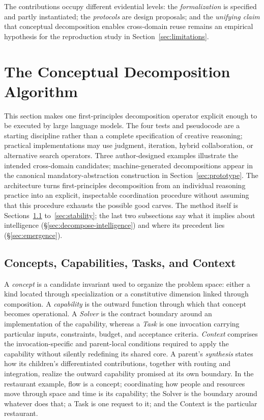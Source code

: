 \documentclass[11pt]{article}
\begin{document}
The contributions occupy different evidential levels: the \emph{formalization} is specified and partly instantiated; the \emph{protocols} are design proposals; and the \emph{unifying claim} that conceptual decomposition enables cross-domain reuse remains an empirical hypothesis for the reproduction study in Section~\ref{sec:limitations}.

\section{The Conceptual Decomposition Algorithm}
\label{sec:algorithm}

This section makes one first-principles decomposition operator explicit enough to be executed by large language models. The four tests and pseudocode are a starting discipline rather than a complete specification of creative reasoning; practical implementations may use judgment, iteration, hybrid collaboration, or alternative search operators. Three author-designed examples illustrate the intended cross-domain candidates; machine-generated decompositions appear in the canonical mandatory-abstraction construction in Section~\ref{sec:prototype}. The architecture turns first-principles decomposition from an individual reasoning practice into an explicit, inspectable coordination procedure without assuming that this procedure exhausts the possible good carves. The method itself is Sections~\ref{sec:concept-task} to~\ref{sec:stability}; the last two subsections say what it implies about intelligence (\S\ref{sec:decompose-intelligence}) and where its precedent lies (\S\ref{sec:emergence}).

\subsection{Concepts, Capabilities, Tasks, and Context}
\label{sec:concept-task}

A \emph{concept} is a candidate invariant used to organize the problem space: either a kind located through specialization or a constitutive dimension linked through composition. A \emph{capability} is the outward function through which that concept becomes operational. A \emph{Solver} is the contract boundary around an implementation of the capability, whereas a \emph{Task} is one invocation carrying particular inputs, constraints, budget, and acceptance criteria. \emph{Context} comprises the invocation-specific and parent-local conditions required to apply the capability without silently redefining its shared core. A parent's \emph{synthesis} states how its children's differentiated contributions, together with routing and integration, realize the outward capability promised at its own boundary. In the restaurant example, flow is a concept; coordinating how people and resources move through space and time is its capability; the Solver is the boundary around whatever does that; a Task is one request to it; and the Context is the particular restaurant.
\end{document}
